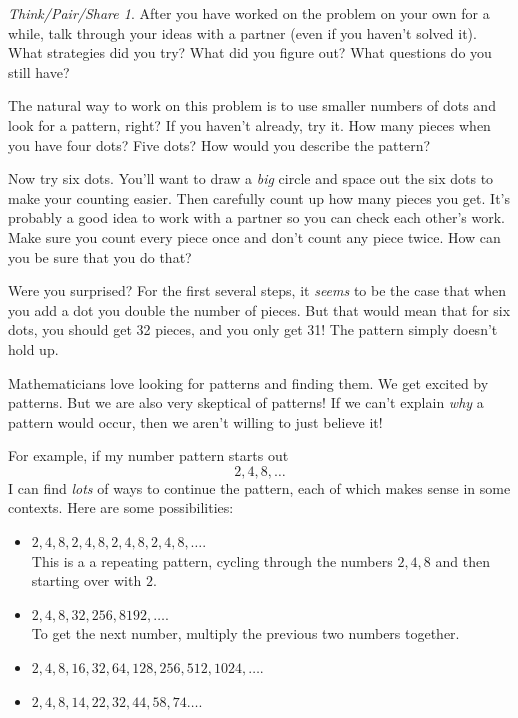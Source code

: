 \documentclass[10pt, reqno]{amsart}
\theoremstyle{remark}
\newtheorem*{thinkpair*}{Think/Pair/Share}
\theoremstyle{definition}
\numberwithin{equation}{section}  %
\begin{document}
\begin{thinkpair*}
After you have worked on the problem on your own for a while, talk through your ideas with a partner (even if you haven't solved it).  What strategies did you try?   What did you figure out?  What questions do you still have?
\end{thinkpair*}


The natural way to work on this problem is to use smaller numbers of dots and look for a pattern, right?  If you haven't already, try it.  How many pieces when you have four dots?  Five dots?   How would you describe the pattern?

Now try six dots.  You'll want to draw a \emph{big} circle and space out the six dots to make your counting easier.  Then carefully count up how many pieces you get.  It's probably a good idea to work with a partner so you can check each other's work.  Make sure you count every piece once and don't count any piece twice.  How can you be sure that you do that?

Were you surprised?  For the first several steps, it  \emph{seems} to be the case that when you add a dot you double the number of pieces.  But that would mean that for six dots, you should get 32 pieces, and you only get 31!  The pattern simply doesn't hold up.


Mathematicians love looking for patterns and finding them.  We get excited by patterns.   But we are also very skeptical of patterns!  If we can't explain \emph{why} a pattern would occur, then we aren't willing to just believe it!  

For example, if my number pattern starts out 
\[
2, 4, 8, \dots
\]
I can find \emph{lots} of ways to continue the pattern, each of which makes sense in some contexts.  Here are some possibilities:
\begin{itemize}
\item
$2, 4, 8, 2, 4, 8, 2, 4, 8, 2, 4, 8, \dots$. \\
This is a a repeating pattern, cycling through the numbers $2, 4, 8$ and then starting over with $2$.\\

\item
$2, 4, 8, 32, 256, 8192,  \dots$. \\
To get the next number, multiply the previous two numbers together.\\

\item
$2, 4, 8, 16, 32, 64, 128, 256, 512, 1024,  \dots$. \\

\item
$2, 4, 8, 14, 22, 32, 44, 58, 74  \dots$. \\

\end{itemize}
\end{document}
